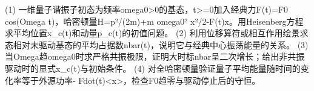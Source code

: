 (1) 一维量子谐振子初态为频率omega0>0的基态，t>=0加入经典力F(t)=F0 cos(Omega t)，哈密顿量H=p²/(2m)+m omega0² x²/2-F(t)x。用Heisenberg方程求平均位置x_c(t)和动量p_c(t)的初值问题。
(2) 利用位移算符或相互作用绘景求态相对未驱动基态的平均占据数nbar(t)，说明它与经典中心振荡能量的关系。
(3) 当Omega趋omega0时求严格共振极限，证明大时标nbar呈二次增长；给出非共振驱动时的显式x_c(t)与初始条件。
(4) 对全哈密顿量验证量子平均能量随时间的变化率等于外源功率- Fdot(t)<x>，检查F0趋零与驱动停止后的守恒。
